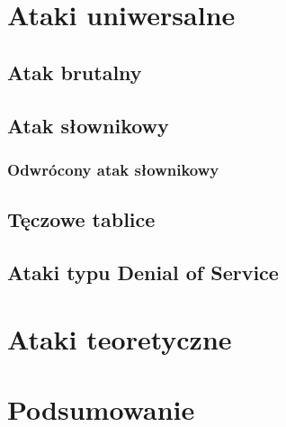 \documentclass[12pt,a4paper,twoside]{article}
\begin{document}
\section{Ataki uniwersalne}
\label{sec:universal_attacks}

\subsection{Atak brutalny}

\subsection{Atak słownikowy}

\subsubsection{Odwrócony atak słownikowy}

\subsection{Tęczowe tablice}

\subsection{Ataki typu Denial of Service}

\section{Ataki teoretyczne}

\section{Podsumowanie}
\end{document}
